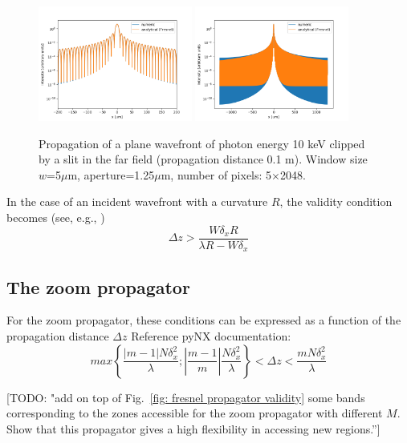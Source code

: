 \documentclass{iucr}              %
\newcommand{\todo}[1]{{\color{red}[TODO: "#1'']}}
\newcommand{\inred}[1]{{\color{red}#1}}
\begin{document}
\begin{figure}\label{fig: far_field}
    \centering
    \includegraphics[width=0.45\textwidth]{far_field_a.png}
    \includegraphics[width=0.45\textwidth]{far_field_b.png}
    \caption{Propagation of a plane wavefront of photon energy 10 keV clipped by a slit in the far field (propagation distance 0.1 m). Window size $w$=5$\mu$m, aperture=1.25$\mu$m, number of pixels: 5$\times$2048. }
\end{figure}

In the case of an incident wavefront with a curvature $R$, the validity condition becomes (see, e.g., \cite{schmidt})
\begin{equation}
\Delta z > \frac{W \delta_x R}{\lambda R - W \delta_x}
\end{equation}


\subsection{The zoom propagator}

For the zoom propagator, these conditions can be expressed as a function of the propagation distance $\Delta z$ \inred{Reference pyNX documentation}:
\begin{equation}\label{eq: good sampling zoom pynx}
max\left\{ \frac{|m-1| N \delta_x^2}{\lambda}; \left| \frac{m-1}{m} \right|\frac{N \delta_x^2}{\lambda} \right\} < \Delta z < \frac{m N \delta_x^2}{\lambda}
\end{equation}

\todo{add on top of Fig.~\ref{fig: fresnel propagator validity} some bands corresponding to the zones accessible for the zoom propagator with different $M$. Show that this propagator gives a high flexibility in accessing new regions.} 
\end{document}
